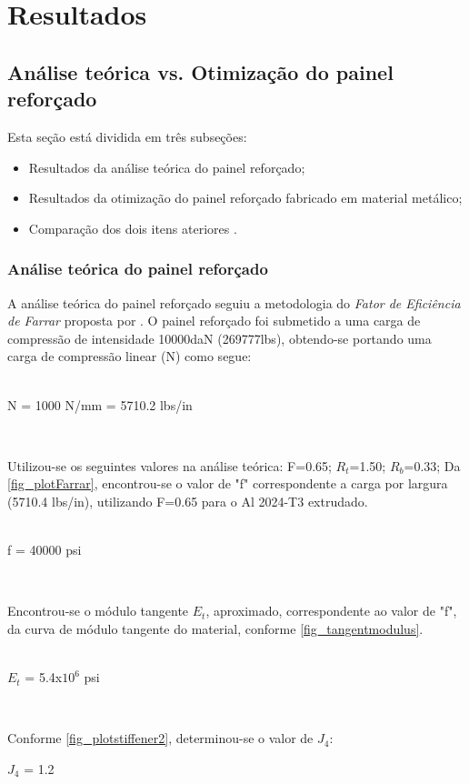 \chapter[Resultados]{Resultados}

\section{Análise teórica vs. Otimização do painel reforçado}
Esta seção está dividida em três subseções:
\begin{itemize}
\item Resultados da análise teórica do painel reforçado;
\item Resultados da otimização do painel reforçado fabricado em material metálico;
\item Comparação dos dois itens ateriores .
\end{itemize}

\subsection{Análise teórica do painel reforçado}
A análise teórica do painel reforçado seguiu a metodologia do \emph{Fator de Eficiência de Farrar} proposta por \cite{niu1997airframe}. O painel reforçado foi submetido a uma carga de compressão de intensidade 10000daN (269777lbs), obtendo-se portando uma carga de compressão linear (N) como segue:\\~\\

\centerline{N = 1000 N/mm = 5710.2 lbs/in}\

Utilizou-se os seguintes valores na análise teórica:
F=0.65; $R_t$=1.50; $R_b$=0.33;
Da \autoref{fig_plotFarrar}, encontrou-se o valor de "f" correspondente a carga por largura (5710.4 lbs/in), utilizando F=0.65 para o Al 2024-T3 extrudado.\\~\\

\centerline{f = 40000 psi}\

Encontrou-se o módulo tangente $E_t$, aproximado, correspondente ao valor de "f", da curva de módulo tangente do material, conforme \autoref{fig_tangentmodulus}.\\~\\

\centerline{$E_t$ = 5.4x$10^6$ psi}
\

Conforme \autoref{fig_plotstiffener2}, determinou-se o valor de $J_4$:

\centerline{$J_4$ = 1.2}\

